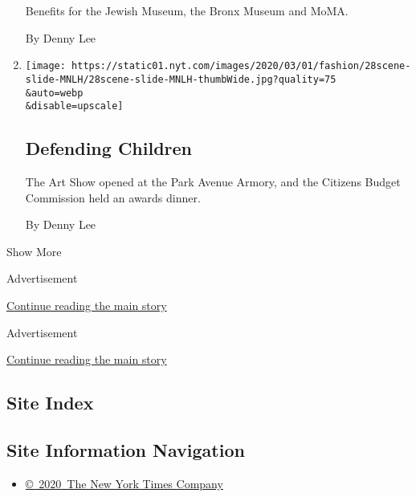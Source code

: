 \begin{enumerate}
  Benefits for the Jewish Museum, the Bronx Museum and MoMA.

  By Denny Lee
\item
  \href{/2020/02/28/style/defending-children.html}{}

  \texttt{[image: https://static01.nyt.com/images/2020/03/01/fashion/28scene-slide-MNLH/28scene-slide-MNLH-thumbWide.jpg?quality=75\\\&auto=webp\\\&disable=upscale]}

  \hypertarget{defending-children}{%
  \subsection{Defending Children}\label{defending-children}}

  The Art Show opened at the Park Avenue Armory, and the Citizens Budget
  Commission held an awards dinner.

  By Denny Lee
\end{enumerate}

Show More

Advertisement

\protect\hyperlink{after-mid1}{Continue reading the main story}

Advertisement

\protect\hyperlink{after-mktg}{Continue reading the main story}

\hypertarget{site-index}{%
\subsection{Site Index}\label{site-index}}

\hypertarget{site-information-navigation}{%
\subsection{Site Information
Navigation}\label{site-information-navigation}}

\begin{itemize}
\tightlist
\item
  \href{https://help.nytimes.com/hc/en-us/articles/115014792127-Copyright-notice}{©~2020~The
  New York Times Company}
\end{itemize}

